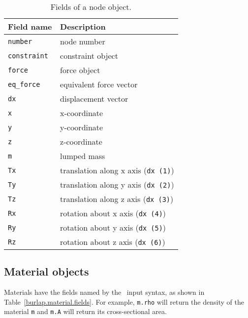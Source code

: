 {\scriptsize
\begin{table}[htbp]
\begin{center}
\begin{tabular}{l|l}
Field name	& Description					\\
\hline
\tt number	& node number					\\
\tt constraint	& constraint object				\\
\tt force	& force object					\\
\tt eq\_force	& equivalent force vector			\\
\tt dx		& displacement vector				\\
\tt x		& x-coordinate					\\
\tt y		& y-coordinate					\\
\tt z		& z-coordinate					\\
\tt m		& lumped mass					\\
\tt Tx		& translation along x axis ({\tt dx (1)})	\\
\tt Ty		& translation along y axis ({\tt dx (2)})	\\
\tt Tz		& translation along z axis ({\tt dx (3)})	\\
\tt Rx		& rotation about x axis ({\tt dx (4)})		\\
\tt Ry		& rotation about y axis ({\tt dx (5)})		\\
\tt Rz		& rotation about z axis ({\tt dx (6)})		\\
\end{tabular}
\caption{Fields of a node object.}
\label{burlap.node.fields}
\end{center}
\end{table}}


\subsection{Material objects}

Materials have the fields named by the \felt\ input syntax, as shown
in Table~\ref{burlap.material.fields}.  For example, {\tt m.rho} will
return the density of the material {\tt m} and {\tt m.A} will return
its cross-sectional area.

